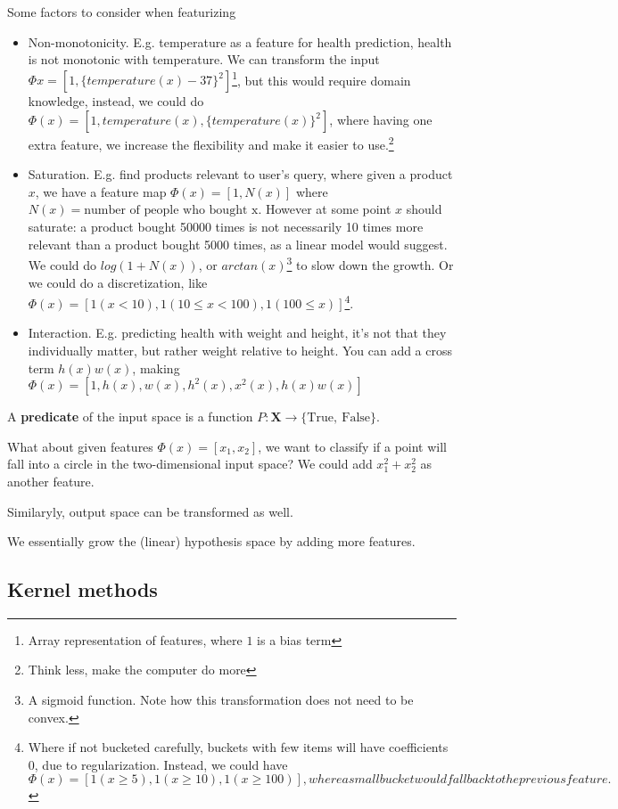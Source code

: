 \documentclass{article}
\begin{document}
Some factors to consider when featurizing
\begin{itemize}
  \item Non-monotonicity. E.g. temperature as a feature for health prediction, health is not monotonic with temperature. We can transform the input $\Phi{x} = [1, \{temperature(x) - 37\}^2]$\footnote{Array representation of features, where $1$ is a bias term}, but this would require domain knowledge, instead, we could do $\Phi(x) = [1, temperature(x), \{temperature(x)\}^2]$, where having one extra feature, we increase the flexibility and make it easier to use.\footnote{Think less, make the computer do more}
  \item Saturation. E.g. find products relevant to user's query, where given a product $x$, we have a feature map $\Phi(x) = [1, N(x)]$ where $N(x) = \text{number of people who bought x}$. However at some point $x$ should saturate: a product bought 50000 times is not necessarily 10 times more relevant than a product bought 5000 times, as a linear model would suggest. We could do $log(1 + N(x))$, or $arctan(x)$\footnote{A sigmoid function. Note how this transformation does not need to be convex.} to slow down the growth. Or we could do a discretization, like $\Phi(x) = [1 (x < 10), 1 (10 \leq x < 100), 1 (100 \leq x)]$\footnote{Where if not bucketed carefully, buckets with few items will have coefficients $0$, due to regularization. Instead, we could have $\Phi(x) = [1 (x \geq 5), 1 (x \geq 10), 1 (x \geq 100)], where a small bucket would fall back to the previous feature.$}.
  \item Interaction. E.g. predicting health with weight and height, it's not that they individually matter, but rather weight relative to height. You can add a cross term $h(x)w(x)$, making $\Phi(x) = [1, h(x), w(x), h^2(x), x^2(x), h(x)w(x)]$
\end{itemize}

A \textbf{predicate} of the input space is a function $P : \mathbf{X} \to \{\text{True},~\text{False}\}$.

What about given features $\Phi(x) = [x_1, x_2]$, we want to classify if a point will fall into a circle in the two-dimensional input space? We could add $x_1^2 + x_2^2$ as another feature.

Similaryly, output space can be transformed as well.

We essentially grow the (linear) hypothesis space by adding more features.

\subsection{Kernel methods}
\end{document}

